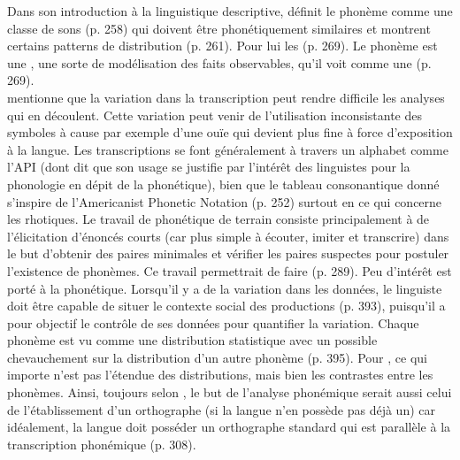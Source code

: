 Dans son introduction à la linguistique descriptive, \textcite{gleasonIntroductionDescriptiveLinguistics1961} définit le phonème comme une classe de sons (p. 258) qui doivent être phonétiquement similaires et montrent certains patterns de distribution (p. 261).
Pour lui les  (p. 269). Le phonème est une , une sorte de modélisation des faits observables, qu'il voit comme une  (p. 269).\\

\textcite{gleasonIntroductionDescriptiveLinguistics1961} mentionne que la variation dans la transcription peut rendre difficile les analyses qui en découlent. Cette variation peut venir de l'utilisation inconsistante des symboles à cause par exemple d'une ouïe qui devient plus fine à force d'exposition à la langue. Les transcriptions se font généralement à travers un alphabet comme l'API (dont \citeauthor{gleasonIntroductionDescriptiveLinguistics1961} dit que son usage se justifie par l'intérêt des linguistes pour la phonologie en dépit de la phonétique), bien que le tableau consonantique donné s'inspire de l'Americanist Phonetic Notation (p. 252) surtout en ce qui concerne les rhotiques.
Le travail de phonétique de terrain consiste principalement à de l'élicitation d'énoncés courts (car plus simple à écouter, imiter et transcrire) dans le but d'obtenir des paires minimales et vérifier les paires suspectes pour postuler l'existence de phonèmes. Ce travail permettrait de faire  (p. 289). Peu d'intérêt est porté à la phonétique. Lorsqu'il y a de la variation dans les données, le linguiste doit être capable de situer le contexte social des productions (p. 393), puisqu'il a pour objectif le contrôle de ses données pour quantifier la variation. Chaque phonème est vu comme une distribution statistique avec un possible chevauchement sur la distribution d'un autre phonème (p. 395).
Pour \citeauthor{gleasonIntroductionDescriptiveLinguistics1961}, ce qui importe n'est pas l'étendue des distributions, mais bien les contrastes entre les phonèmes.
Ainsi, toujours selon \citeauthor{gleasonIntroductionDescriptiveLinguistics1961}, le but de l'analyse phonémique serait aussi celui de l'établissement d'un orthographe (si la langue n'en possède pas déjà un) car idéalement, la langue doit posséder un orthographe standard qui est parallèle à la transcription phonémique (p. 308).\\

